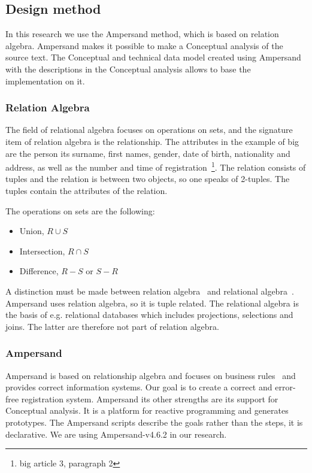 \subsection{Design method} \label{design_method}
In this research we use the Ampersand method, which is based on relation algebra.
Ampersand makes it possible to make a Conceptual analysis of the source text.
The Conceptual and technical data model created using Ampersand with the descriptions in the Conceptual analysis allows to base the implementation on it.

\subsubsection{Relation Algebra} \label{relation_algebra}
The field of relational algebra focuses on operations on sets, and the signature item of relation algebra is the relationship.
The attributes in the example of \acrshort{big} are the person its surname, first names, gender, date of birth, nationality and address, as well as the number and time of registration~\footnote{\acrlong{big} article 3, paragraph 2 }.
The relation consists of tuples and the relation is between two objects, so one speaks of 2-tuples.
The tuples contain the attributes of the relation.

\begin{samepage}The operations on sets are the following:
\begin{itemize}
    \item Union, $R \cup S$ %
    \item Intersection, $R \cap S$ %
    \item Difference, $R - S$ or $S - R$ %
\end{itemize}
\end{samepage}
A distinction must be made between relation algebra~\citep{maddux_bibliography_2006} and relational algebra~\citep{codd_relational_1970}.
Ampersand uses relation algebra, so it is tuple related.
The relational algebra is the basis of e.g. relational databases which includes projections, selections and joins.
The latter are therefore not part of relation algebra.


\subsubsection{Ampersand} \label{ampersand}
Ampersand is based on relationship algebra and focuses on business rules~ and provides correct information systems.
Our goal is to create a correct and error-free registration system.
Ampersand its other strengths are its support for Conceptual analysis.
It is a platform for reactive programming and generates prototypes.
The Ampersand scripts describe the goals rather than the steps, it is declarative.
We are using Ampersand-v4.6.2 in our research.

